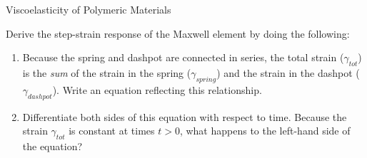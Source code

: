 \begin{activity}{Viscoelasticity of Polymeric Materials}
\begin{exercises}
\begin{enumerate}
			\end{enumerate}
			
		
		
			
		\exercise \label{\labelbase:exc:maxwell} Derive the step-strain response of the Maxwell element by doing the following:
			
			\begin{enumerate}
					
				\item Because the spring and dashpot are connected in series, the total strain ($\gamma_{tot}$) is the \emph{sum} of the strain in the spring ($\gamma_{spring}$) and the strain in the dashpot ($\gamma_{dashpot}$).  Write an equation reflecting this relationship.
				
					\begin{solution}\end{solution}
					
				\item Differentiate both sides of this equation with respect to time.  Because the strain $\gamma_{tot}$ is constant at times $t>0$, what happens to the left-hand side of the equation?
				
					\begin{solution}\end{solution}
				

\end{enumerate}
\end{exercises}
\end{activity}
